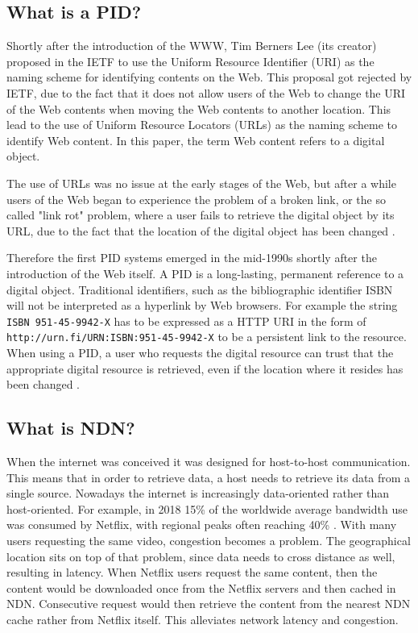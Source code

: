\subsection{What is a PID?}
Shortly after the introduction of the WWW, Tim Berners Lee (its creator) proposed in the IETF to use the Uniform Resource Identifier (URI) as the naming scheme for identifying 
contents on the Web. This proposal got rejected by IETF, due to the fact that it does not allow users of the Web to change the URI of the Web contents when moving the Web contents to another location. This lead to the use of Uniform Resource Locators (URLs) as the naming scheme to identify Web content. In this paper, the term Web content refers to a digital object.
 
The use of URLs was no issue at the early stages of the Web, but after a while users of the Web began to experience the problem of a broken link, or the so called "link rot" problem, 
where a user fails to retrieve the digital object by its URL, 
due to the fact that the location of the digital object has been changed \cite{icn-bd, ark-id}. 

Therefore the first PID systems emerged in the mid-1990s shortly after the introduction of the Web itself. 
A PID is a long-lasting, permanent reference to a digital object. Traditional identifiers, such as the bibliographic identifier ISBN will not be interpreted as a 
hyperlink by Web browsers. For example the string \texttt{ISBN 951-45-9942-X} has to be expressed as a HTTP URI in the form of \texttt{http://urn.fi/URN:ISBN:951-45-9942-X} to be a persistent link to the resource.  
When using a PID, a user who requests the digital resource can trust that the appropriate digital resource is retrieved, even if the location where it resides has been changed \cite{pid-oview}.

\subsection{What is NDN?}
When the internet was conceived it was designed for host-to-host communication. This means that in order to retrieve data, a host needs to retrieve its data from a single source. Nowadays the internet is increasingly data-oriented rather than host-oriented. For example, in 2018 15\% of the worldwide average bandwidth use was consumed by Netflix, with regional peaks often reaching 40\% \cite{introduction-netflix}. With many users requesting the same video, congestion becomes a problem. The geographical location sits on top of that problem, since data needs to cross distance as well, resulting in latency. When Netflix users request the same content, then the content would be downloaded once from the Netflix servers and then cached in NDN. Consecutive request would then retrieve the content from the nearest NDN cache rather from Netflix itself. This alleviates network latency and congestion.

